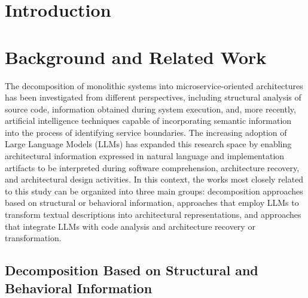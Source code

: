 \documentclass[acmsmall,screen,anonymous,review]{acmart}
\begin{document}




\maketitle

\section{Introduction}

\section{Background and Related Work}

The decomposition of monolithic systems into microservice-oriented architectures has been investigated from different perspectives, including structural analysis of source code, information obtained during system execution, and, more recently, artificial intelligence techniques capable of incorporating semantic information into the process of identifying service boundaries. The increasing adoption of Large Language Models (LLMs) has expanded this research space by enabling architectural information expressed in natural language and implementation artifacts to be interpreted during software comprehension, architecture recovery, and architectural design activities. In this context, the works most closely related to this study can be organized into three main groups: decomposition approaches based on structural or behavioral information, approaches that employ LLMs to transform textual descriptions into architectural representations, and approaches that integrate LLMs with code analysis and architecture recovery or transformation.

\subsection{Decomposition Based on Structural and Behavioral Information}
\end{document}
